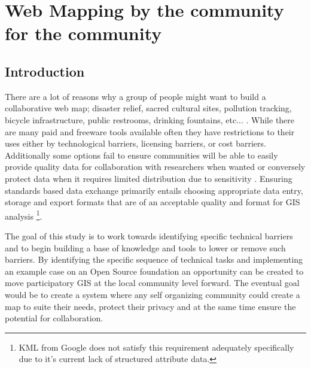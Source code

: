 \documentclass[12pt,letterpaper]{article}
\begin{document}
%

\section{Web Mapping by the community for the community}
\subsection{Introduction}

	There are a lot of reasons why a group of people might want to build a collaborative web map; disaster relief, sacred cultural sites, pollution tracking, bicycle infrastructure, public restrooms, drinking fountains, etc... \parencite{Zook2010,Goodchild2007,Dennis2006}. While there are many paid and freeware tools available often they have restrictions to their uses either by technological barriers, licensing barriers, or cost barriers. Additionally some options fail to ensure communities will be able to easily provide quality data for collaboration with researchers when wanted or conversely protect data when it requires limited distribution due to sensitivity \parencite{Curtis2006}. Ensuring standards based data exchange primarily entails choosing appropriate data entry, storage and export formats that are of an acceptable quality and format for GIS analysis \parencite{Brando2010}\footnote{KML from Google does not satisfy this requirement adequately specifically due to it's current lack of structured attribute data.}.

	The goal of this study is to work towards identifying specific technical barriers and to begin building a base of knowledge and tools to lower or remove such barriers. By identifying the specific sequence of technical tasks and implementing an example case on an Open Source foundation an opportunity can be created to move participatory GIS at the local community level forward. The eventual goal would be to create a system where any self organizing community could create a map to suite their needs, protect their privacy and at the same time ensure the potential for collaboration.
\end{document}
